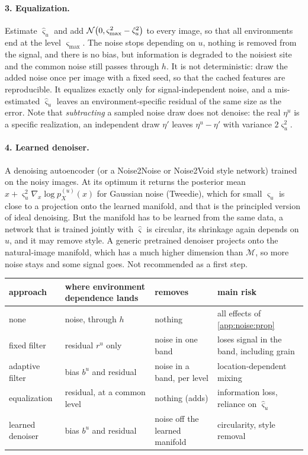 \paragraph{3. Equalization.} Estimate $\hat\varsigma_u$ and add $\mathcal{N}\bigl(0,\varsigma_{\max}^2-\hat\varsigma_u^2\bigr)$
to every image, so that all environments end at the level $\varsigma_{\max}$. The noise stops depending on $u$, nothing is
removed from the signal, and there is no bias, but information is degraded to the noisiest site and the
common noise still passes through $h$. It is not deterministic: draw the added noise once per image with
a fixed seed, so that the cached features are reproducible. It equalizes exactly only for
signal-independent noise, and a mis-estimated $\hat\varsigma_u$ leaves an environment-specific residual of
the same size as the error. Note that \emph{subtracting} a sampled noise draw does not denoise: the
real $\eta^u$ is a specific realization, an independent draw $\eta'$ leaves $\eta^u-\eta'$ with variance
$2\varsigma_u^2$.

\paragraph{4. Learned denoiser.} A denoising autoencoder (or a Noise2Noise or Noise2Void style network)
trained on the noisy images. At its optimum it returns the posterior mean
$x+\varsigma_u^2\nabla_x\log p^{(u)}_X(x)$ for Gaussian noise (Tweedie), which for small $\varsigma_u$ is close
to a projection onto the learned manifold, and that is the principled version of ideal denoising. But the manifold has to be
learned from the same data, a network that is trained jointly with $\hat\varsigma$ is circular, its
shrinkage again depends on $u$, and it may remove style. A generic pretrained denoiser projects onto the
natural-image manifold, which has a much higher dimension than $\mathcal M$, so more noise stays and some signal
goes. Not recommended as a first step.

\begin{center}
\small
\begin{tabular}{@{}l L{4.2cm} L{3.8cm} L{4.3cm}@{}}
\toprule
approach & where environment dependence lands & removes & main risk\\
\midrule
none & noise, through $h$ & nothing & all effects of \cref{app:noise:prop}\\
fixed filter & residual $r^u$ only & noise in one band & loses signal in the band, including grain\\
adaptive filter & bias $b^u$ and residual & noise in a band, per level & location-dependent mixing\\
equalization & residual, at a common level & nothing (adds) & information loss, reliance on $\hat\varsigma_u$\\
learned denoiser & bias $b^u$ and residual & noise off the learned manifold & circularity, style removal\\
\bottomrule
\end{tabular}
\end{center}

